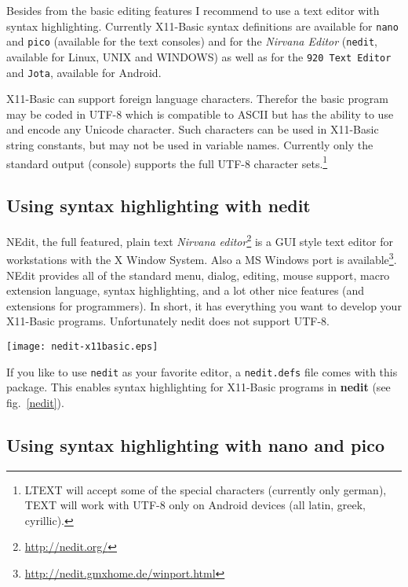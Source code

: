 Besides from the basic editing features I recommend to use a text editor with
syntax highlighting. Currently X11-Basic syntax definitions are available for 
\verb|nano| and \verb|pico| (available for the text consoles) and for  the {\it
Nirvana Editor} (\verb|nedit|, available for Linux, UNIX and WINDOWS)  as well
as for the \verb|920 Text Editor| and \verb|Jota|, available for Android.

X11-Basic can support foreign language characters. Therefor the basic program
may be coded in UTF-8 which is compatible to ASCII but has the  ability to use
and encode any Unicode character. Such characters can be used in X11-Basic
string constants, but may not be used in variable names. Currently  only the
standard output (console) supports the full UTF-8 character
sets.\footnote{LTEXT will accept some of the special characters
(currently only german), TEXT will work with UTF-8 only on Android
devices (all latin, greek, cyrillic). }

\subsection*{Using syntax highlighting with {\bf nedit}}

NEdit, the full featured, plain text {\it Nirvana 
editor}\footnote{\url{http://nedit.org/}} is a GUI style text editor for
workstations with the X Window System.  Also a MS Windows port is
available\footnote{ \url{http://nedit.gmxhome.de/winport.html}}. NEdit provides
all of the standard menu, dialog, editing, mouse support, macro extension
language, syntax highlighting, and a lot other nice features (and extensions for
programmers). In short, it has everything you want to develop your X11-Basic
programs. Unfortunately nedit does not support UTF-8.

\begin{SCfigure}
\texttt{[image: nedit-x11basic.eps]}
\caption{The Nirvana Editor with syntax highlighting for a X11-Basic program.}
\label{nedit}
\end{SCfigure}

If you like to use \verb|nedit| as your favorite editor, a \verb|nedit.defs| file
comes  with this package. This enables syntax highlighting for X11-Basic
programs in {\bf nedit} (see fig.~\ref{nedit}).

\subsection*{Using syntax highlighting with {\bf nano} and {\bf pico}}

